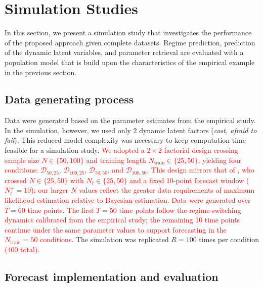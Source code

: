 \section{Simulation Studies}\label{sec:sim}
In this section, we present a simulation study that investigates the performance of the proposed approach given complete datasets. Regime prediction, prediction of the dynamic latent variables, and parameter retrieval are evaluated with a population model that is build upon the characteristics of the empirical example in the previous section. 

\subsection{Data generating process}
Data were generated based on the parameter estimates from the empirical study. In the simulation, however, we used only 2 dynamic latent factors (\textit{cost, afraid to fail}). This reduced model complexity was necessary to keep computation time feasible for a simulation study.
\textcolor{red}{We adopted a $2 \times 2$ factorial design crossing sample size $N \in \{50, 100\}$ and training length $N_{\text{train}} \in \{25, 50\}$, yielding four conditions: $\mathcal{D}_{50,25}$, $\mathcal{D}_{100,25}$, $\mathcal{D}_{50,50}$, and $\mathcal{D}_{100,50}$. This design mirrors that of \cite{Kelava2022}, who crossed $N \in \{25, 50\}$ with $N_t \in \{25, 50\}$ and a fixed 10-point forecast window ($N_t^{+}=10$); our larger $N$ values reflect the greater data requirements of maximum likelihood estimation relative to Bayesian estimation. Data were generated over $T=60$ time points. The first $T=50$ time points follow the regime-switching dynamics calibrated from the empirical study; the remaining 10 time points continue under the same parameter values to support forecasting in the $N_{\text{train}}=50$ conditions.} The simulation was replicated $R=100$ times per condition \textcolor{red}{($400$ total)}.

\subsection{Forecast implementation and evaluation}

